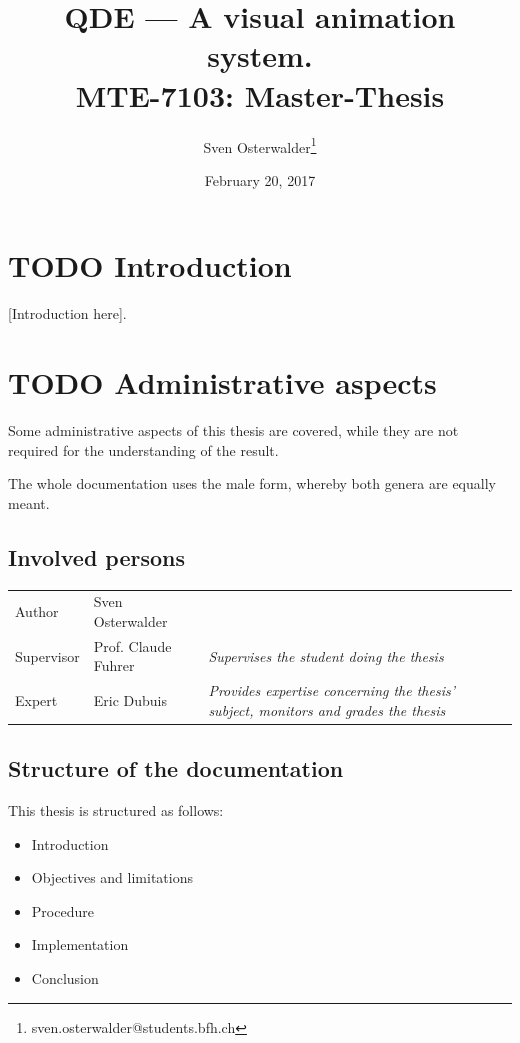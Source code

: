 \documentclass[10pt, openright, notitlepage]{scrreprt}
\author{Sven Osterwalder\thanks{sven.osterwalder@students.bfh.ch}}
\date{February 20, 2017}
\title{QDE --- A visual animation system.\\\medskip
\large MTE-7103: Master-Thesis}
\begin{document}
\maketitle
\tableofcontents


\chapter{{\bfseries\sffamily TODO} Introduction}
\label{sec:orgbf7ff44}

[Introduction here].

\chapter{{\bfseries\sffamily TODO} Administrative aspects}
\label{sec:orgfe1c5b4}

Some administrative aspects of this thesis are covered, while they are not
required for the understanding of the result.

The whole documentation uses the male form, whereby both genera are equally
meant.

\section{Involved persons}
\label{sec:orgb2587f4}

\begin{center}
\begin{tabular}{lll}
Author & Sven Osterwalder\footnotemark & \\
Supervisor & Prof. Claude Fuhrer\footnotemark & \emph{Supervises the student doing the thesis}\\
Expert & Eric Dubuis\footnotemark & \emph{Provides expertise concerning the thesis' subject, monitors and grades the thesis}\\
\end{tabular}
\end{center}

\section{Structure of the documentation}
\label{sec:orgc77c6b5}

This thesis is structured as follows:

\begin{itemize}
\item Introduction
\item Objectives and limitations
\item Procedure
\item Implementation
\item Conclusion
\end{itemize}
\end{document}
